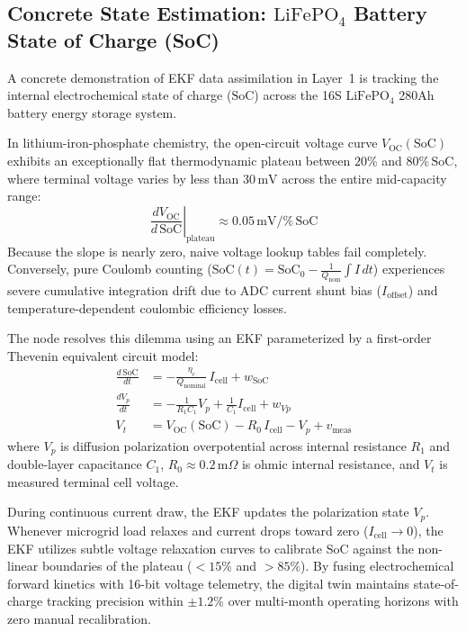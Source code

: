 \subsection{Concrete State Estimation: \texorpdfstring{$\mathrm{LiFePO}_4$}{LiFePO4} Battery State of Charge (SoC)}
A concrete demonstration of EKF data assimilation in Layer~1 is tracking the internal electrochemical state of charge ($\mathrm{SoC}$) across the 16S $\mathrm{LiFePO}_4$ 280Ah battery energy storage system.

In lithium-iron-phosphate chemistry, the open-circuit voltage curve $V_{\mathrm{OC}}(\mathrm{SoC})$ exhibits an exceptionally flat thermodynamic plateau between $20\%$ and $80\%\,\mathrm{SoC}$, where terminal voltage varies by less than $30\,\mathrm{mV}$ across the entire mid-capacity range:
\begin{equation}
\left. \frac{d V_{\mathrm{OC}}}{d\,\mathrm{SoC}} \right|_{\mathrm{plateau}} \approx 0.05\,\mathrm{mV} / \%\,\mathrm{SoC}
\label{eq:lfp_plateau_slope}
\end{equation}
Because the slope is nearly zero, naive voltage lookup tables fail completely. Conversely, pure Coulomb counting ($\mathrm{SoC}(t) = \mathrm{SoC}_0 - \frac{1}{Q_{\mathrm{nom}}} \int I \, dt$) experiences severe cumulative integration drift due to ADC current shunt bias ($I_{\mathrm{offset}}$) and temperature-dependent coulombic efficiency losses.

The node resolves this dilemma using an EKF parameterized by a first-order Thevenin equivalent circuit model:
\begin{align}
\frac{d\,\mathrm{SoC}}{dt} &= -\frac{\eta_c}{Q_{\mathrm{nominal}}} \, I_{\mathrm{cell}} + w_{\mathrm{SoC}} \label{eq:soc_state_dot} \\
\frac{d V_p}{dt} &= -\frac{1}{R_1 C_1} V_p + \frac{1}{C_1} I_{\mathrm{cell}} + w_{Vp} \label{eq:vp_state_dot} \\
V_t &= V_{\mathrm{OC}}(\mathrm{SoC}) - R_0 \, I_{\mathrm{cell}} - V_p + v_{\mathrm{meas}} \label{eq:terminal_voltage}
\end{align}
where $V_p$ is diffusion polarization overpotential across internal resistance $R_1$ and double-layer capacitance $C_1$, $R_0 \approx 0.2\,\mathrm{m}\Omega$ is ohmic internal resistance, and $V_t$ is measured terminal cell voltage.

During continuous current draw, the EKF updates the polarization state $V_p$. Whenever microgrid load relaxes and current drops toward zero ($I_{\mathrm{cell}} \to 0$), the EKF utilizes subtle voltage relaxation curves to calibrate $\mathrm{SoC}$ against the non-linear boundaries of the plateau ($<15\%$ and $>85\%$). By fusing electrochemical forward kinetics with 16-bit voltage telemetry, the digital twin maintains state-of-charge tracking precision within $\pm 1.2\%$ over multi-month operating horizons with zero manual recalibration.

